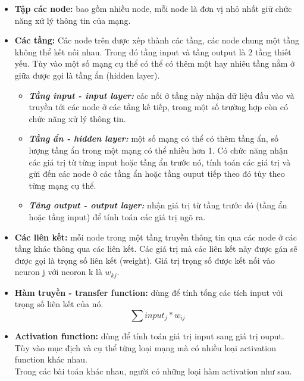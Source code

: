 	\begin{itemize}
		\item \textbf{Tập các node:} bao gồm nhiều node, mỗi node là đơn vị nhỏ nhất giữ chức năng xử lý thông tin của mạng.
		\item \textbf{Các tầng:} Các node trên được xếp thành các tầng, các node chung một tầng không thể kết nối nhau. Trong đó tầng input và tầng output là 2 tầng thiết yếu. Tùy vào một số mạng cụ thể có thể có thêm một hay nhiêu tầng nằm ở giữa được gọi là tầng ẩn (hidden layer).
		\begin{itemize}
			\item \textbf{\textit{Tầng input - input layer: }}các nối ở tầng này nhận dữ liệu đầu vào và truyền tới các node ở các tầng kế tiếp, trong một số trường hợp còn có chức năng xử lý thông tin.
			\item \textbf{\textit{Tầng ẩn - hidden layer: }}một số mạng có thể có thêm tầng ẩn, số lượng tầng ẩn trong một mạng có thể nhiều hơn 1. Có chức năng nhận các giá trị từ từng input hoặc tầng ẩn trước nó, tính toán các giá trị và gửi đến các node ở các tầng ẩn hoặc tầng ouput tiếp theo đó tùy theo từng mạng cụ thể.
			\item \textbf{\textit{Tâng output - output layer: }}nhận giá trị từ tầng trước đó (tầng ẩn hoặc tầng input) để tính toán các giá trị ngõ ra.
		\end{itemize}
		\item \textbf{Các liên kết:} mỗi node trong một tầng truyền thông tin qua các node ở các tầng khác thông qua các liên kết. Các giá trị mà các liên kết này được gán sẽ được gọi là trọng số liên kết (weight). Giá trị trọng số được kết nối vào neuron j với neoron k là \(w_{kj}\).
		\item \textbf{Hàm truyền - transfer function: }dùng để tính tổng các tích input với trọng số liên kết của nó. \[ \sum input_j*w_{ij}\]
		
		\item \textbf{Activation function: }dùng để tính toán giá trị input sang giá trị ouput. Tùy vào mục địch và cụ thể từng loại mạng mà có nhiều loại activation function khác nhau.\\
		Trong các bài toán khác nhau, người có những loại hàm activation như sau.
		

\end{itemize}
